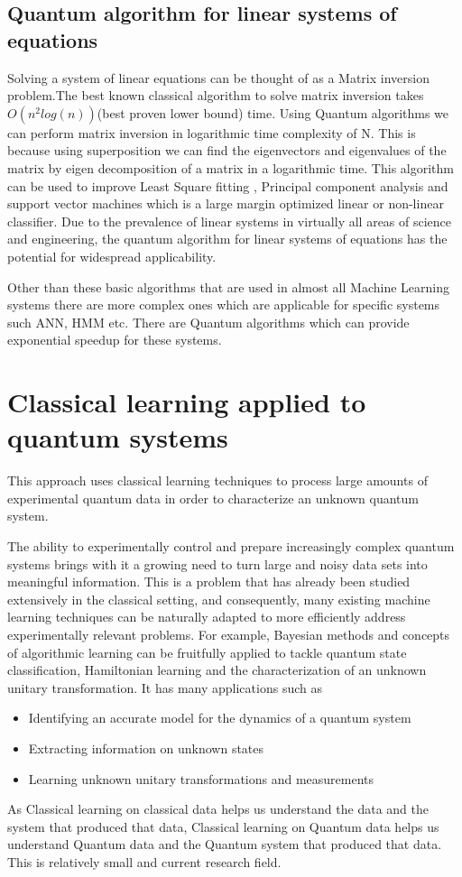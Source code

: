 \subsection{Quantum algorithm for linear systems of equations}
Solving a system of linear equations can be thought of as a Matrix inversion problem.The best known classical algorithm to solve matrix inversion takes $O(n^2log(n))$(best proven lower bound) time. Using Quantum algorithms we can perform matrix inversion in logarithmic time complexity of N. This is because using superposition we can find the eigenvectors and eigenvalues of the matrix by eigen decomposition of a matrix in a logarithmic time. This algorithm can be used to improve Least Square fitting , Principal component analysis and support vector machines which is a large margin optimized linear or non-linear classifier.
Due to the prevalence of linear systems in virtually all areas of science and engineering, the quantum algorithm for linear systems of equations has the potential for widespread applicability.\par\bigskip

Other than these basic algorithms that are used in almost all Machine Learning systems there are more complex ones which are applicable for specific systems such ANN, HMM etc. There are Quantum algorithms which can provide exponential speedup for these systems.

\section{Classical learning applied to quantum systems} 
This approach uses classical learning techniques to process large amounts of experimental quantum data in order to characterize an unknown quantum system.\par\bigskip
The ability to experimentally control and prepare increasingly complex quantum systems brings with it a growing need to turn large and noisy data sets into meaningful information. This is a problem that has already been studied extensively in the classical setting, and consequently, many existing machine learning techniques can be naturally adapted to more efficiently address experimentally relevant problems. For example, Bayesian methods and concepts of algorithmic learning can be fruitfully applied to tackle quantum state classification, Hamiltonian learning and the characterization of an unknown unitary transformation.
It has many applications such as 
\begin{itemize}
\item Identifying an accurate model for the dynamics of a quantum system
\item Extracting information on unknown states
\item Learning unknown unitary transformations and measurements
\end{itemize}
As Classical learning on classical data helps us understand the data and the system that produced that data, Classical learning on Quantum data helps us understand Quantum data and the Quantum system that produced that data. 
This is relatively small and current research field. 



